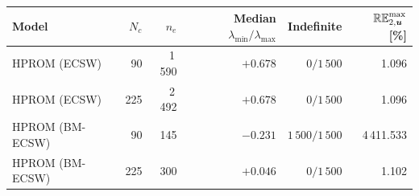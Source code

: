 \begin{tabular}{@{}lrrrrr@{}}
\toprule
Model & $N_c$ & $n_e$ & Median $\lambda_{\min}/\lambda_{\max}$ & Indefinite & $\mathbb{RE}_{2,\boldsymbol{u}}^{\max}$ [\%]\\
\midrule
HPROM (ECSW) & 90 & 1\,590 & $+0.678$ & $0/1\,500$ & 1.096\\
HPROM (ECSW) & 225 & 2\,492 & $+0.678$ & $0/1\,500$ & 1.096\\
HPROM (BM-ECSW) & 90 & 145 & $-0.231$ & $1\,500/1\,500$ & 4\,411.533\\
HPROM (BM-ECSW) & 225 & 300 & $+0.046$ & $0/1\,500$ & 1.102\\
\bottomrule
\end{tabular}

